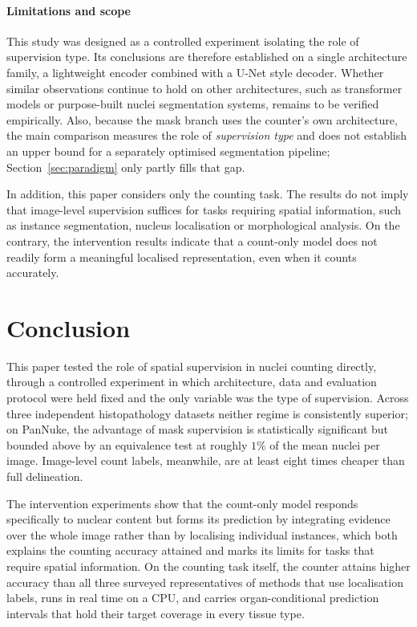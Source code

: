 \documentclass[preprint,12pt]{elsarticle}
\begin{document}
\paragraph{Limitations and scope} This study was designed as a controlled experiment isolating the role of
supervision type. Its conclusions are therefore established on a single architecture family, a lightweight
encoder combined with a U-Net style decoder. Whether similar observations continue to hold on other
architectures, such as transformer models or purpose-built nuclei segmentation systems, remains to be verified
empirically. Also, because the mask branch uses the counter's own architecture, the main comparison measures
the role of \emph{supervision type} and does not establish an upper bound for a separately optimised
segmentation pipeline; Section~\ref{sec:paradigm} only partly fills that gap.

In addition, this paper considers only the counting task. The results do not imply that image-level supervision
suffices for tasks requiring spatial information, such as instance segmentation, nucleus localisation or
morphological analysis. On the contrary, the intervention results indicate that a count-only model does not
readily form a meaningful localised representation, even when it counts accurately.

\section{Conclusion}\label{sec:conclusion}

This paper tested the role of spatial supervision in nuclei counting directly, through a controlled experiment
in which architecture, data and evaluation protocol were held fixed and the only variable was the type of
supervision. Across three independent histopathology datasets neither regime is consistently superior; on
PanNuke, the advantage of mask supervision is statistically significant but bounded above by an equivalence
test at roughly $1\%$ of the mean nuclei per image. Image-level count labels, meanwhile, are at least eight
times cheaper than full delineation.

The intervention experiments show that the count-only model responds specifically to nuclear content but forms
its prediction by integrating evidence over the whole image rather than by localising individual instances,
which both explains the counting accuracy attained and marks its limits for tasks that require spatial
information. On the counting task itself, the counter attains higher accuracy than all three surveyed
representatives of methods that use localisation labels, runs in real time on a CPU, and carries
organ-conditional prediction intervals that hold their target coverage in every tissue type.
\end{document}
